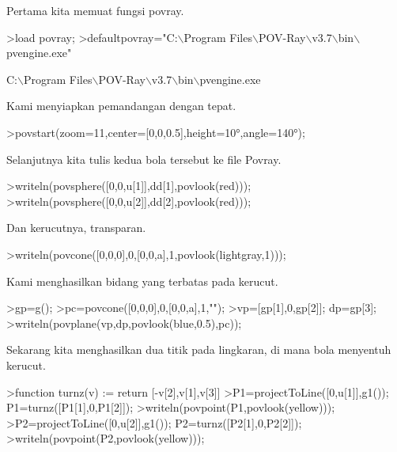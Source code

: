 \documentclass[12pt,arial,letterpaper]{book}
\begin{document}
\begin{eulernootebook}
\begin{eulercomment}
\begin{eulercomment}
\begin{eulernootebook}
\begin{eulercomment}
\begin{eulercomment}
\begin{eulercomment}
\begin{eulercomment}
\begin{eulercomment}
\begin{eulercomment}
\begin{eulernotebook}
\begin{eulercomment}
\begin{eulercomment}
\begin{eulercomment}
\begin{eulercomment}
\begin{eulercomment}
\begin{eulercomment}
\begin{eulercomment}
Pertama kita memuat fungsi povray.
\end{eulercomment}
\begin{eulerprompt}
>load povray;
>defaultpovray="C:\(\backslash\)Program Files\(\backslash\)POV-Ray\(\backslash\)v3.7\(\backslash\)bin\(\backslash\)pvengine.exe"
\end{eulerprompt}
\begin{euleroutput}
  C:\(\backslash\)Program Files\(\backslash\)POV-Ray\(\backslash\)v3.7\(\backslash\)bin\(\backslash\)pvengine.exe
\end{euleroutput}
\begin{eulercomment}
Kami menyiapkan pemandangan dengan tepat.
\end{eulercomment}
\begin{eulerprompt}
>povstart(zoom=11,center=[0,0,0.5],height=10°,angle=140°);
\end{eulerprompt}
\begin{eulercomment}
Selanjutnya kita tulis kedua bola tersebut ke file Povray.
\end{eulercomment}
\begin{eulerprompt}
>writeln(povsphere([0,0,u[1]],dd[1],povlook(red)));
>writeln(povsphere([0,0,u[2]],dd[2],povlook(red)));
\end{eulerprompt}
\begin{eulercomment}
Dan kerucutnya, transparan.
\end{eulercomment}
\begin{eulerprompt}
>writeln(povcone([0,0,0],0,[0,0,a],1,povlook(lightgray,1)));
\end{eulerprompt}
\begin{eulercomment}
Kami menghasilkan bidang yang terbatas pada kerucut.
\end{eulercomment}
\begin{eulerprompt}
>gp=g();
>pc=povcone([0,0,0],0,[0,0,a],1,"");
>vp=[gp[1],0,gp[2]]; dp=gp[3];
>writeln(povplane(vp,dp,povlook(blue,0.5),pc));
\end{eulerprompt}
\begin{eulercomment}
Sekarang kita menghasilkan dua titik pada lingkaran, di mana bola
menyentuh kerucut.
\end{eulercomment}
\begin{eulerprompt}
>function turnz(v) := return [-v[2],v[1],v[3]]
>P1=projectToLine([0,u[1]],g1()); P1=turnz([P1[1],0,P1[2]]);
>writeln(povpoint(P1,povlook(yellow)));
>P2=projectToLine([0,u[2]],g1()); P2=turnz([P2[1],0,P2[2]]);
>writeln(povpoint(P2,povlook(yellow)));
\end{eulerprompt}

\end{eulercomment}
\end{eulercomment}
\end{eulercomment}
\end{eulercomment}
\end{eulercomment}
\end{eulercomment}
\end{eulernotebook}
\end{eulercomment}
\end{eulercomment}
\end{eulercomment}
\end{eulercomment}
\end{eulercomment}
\end{eulercomment}
\end{eulernootebook}
\end{eulercomment}
\end{eulercomment}
\end{eulernootebook}
\end{document}
